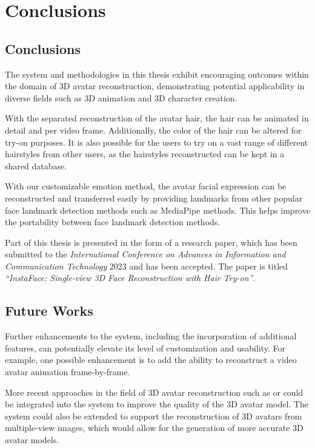 \section{Conclusions}\label{sec:conclusions}

\subsection{Conclusions}

The system and methodologies in this thesis exhibit encouraging outcomes within the domain of 3D avatar reconstruction, demonstrating potential applicability in diverse fields such as 3D animation and 3D character creation.

With the separated reconstruction of the avatar hair, the hair can be animated in detail and per video frame. Additionally, the color of the hair can be altered for try-on purposes. It is also possible for the users to try on a vast range of different hairstyles from other users, as the hairstyles reconstructed can be kept in a shared database.

With our customizable emotion method, the avatar facial expression can be reconstructed and transferred easily by providing landmarks from other popular face landmark detection methods such as MediaPipe \cite{lugaresiMediaPipeFrameworkBuilding2019} methods. This helps improve the portability between face landmark detection methods.

Part of this thesis is presented in the form of a research paper, which has been submitted to the \textit{International Conference on Advances in Information and Communication Technology} 2023 and has been accepted. The paper is titled \textit{``InstaFace: Single-view 3D Face Reconstruction with Hair Try-on''}.

\subsection{Future Works}

Further enhancements to the system, including the incorporation of additional features, can potentially elevate its level of customization and usability. For example, one possible enhancement is to add the ability to reconstruct a video avatar animation frame-by-frame.

More recent approaches in the field of 3D avatar reconstruction such as  or  could be integrated into the system to improve the quality of the 3D avatar model. The system could also be extended to support the reconstruction of 3D avatars from multiple-view images, which would allow for the generation of more accurate 3D avatar models.